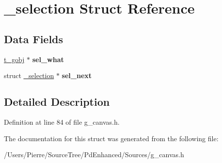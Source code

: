\hypertarget{struct__selection}{\section{\-\_\-selection Struct Reference}
\label{struct__selection}
}
\subsection*{Data Fields}
\begin{DoxyCompactItemize}
\item 
\hypertarget{struct__selection_af26e1c79151ff3fe6f918b3f88dafa62}{\hyperlink{struct__gobj}{t\-\_\-gobj} $\ast$ {\bfseries sel\-\_\-what}}\label{struct__selection_af26e1c79151ff3fe6f918b3f88dafa62}

\item 
\hypertarget{struct__selection_ad0cb678b1df8cd59dc699324f3957b31}{struct \hyperlink{struct__selection}{\-\_\-selection} $\ast$ {\bfseries sel\-\_\-next}}\label{struct__selection_ad0cb678b1df8cd59dc699324f3957b31}

\end{DoxyCompactItemize}


\subsection{Detailed Description}


Definition at line 84 of file g\-\_\-canvas.\-h.



The documentation for this struct was generated from the following file\-:\begin{DoxyCompactItemize}
\item 
/\-Users/\-Pierre/\-Source\-Tree/\-Pd\-Enhanced/\-Sources/g\-\_\-canvas.\-h\end{DoxyCompactItemize}
